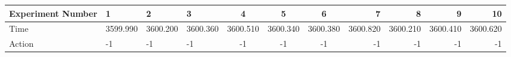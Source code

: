 \documentclass[8pt]{article}
\begin{document}
\begin{landscape}
\begin{tabular}{ | l | l | l | l | c | c | c | r | r | r | r | }
 \hline 
Experiment Number & 1 & 2 & 3 & 4 & 5 & 6 & 7 & 8 & 9 & 10\\ \hline
Time & 3599.990 & 3600.200 & 3600.360 & 3600.510 & 3600.340 & 3600.380 & 3600.820 & 3600.210 & 3600.410 & 3600.620\\ \hline
Action & -1 & -1 & -1 & -1 & -1 & -1 & -1 & -1 & -1 & -1\\ \hline\end{tabular}
\end{landscape}
\end{document}

